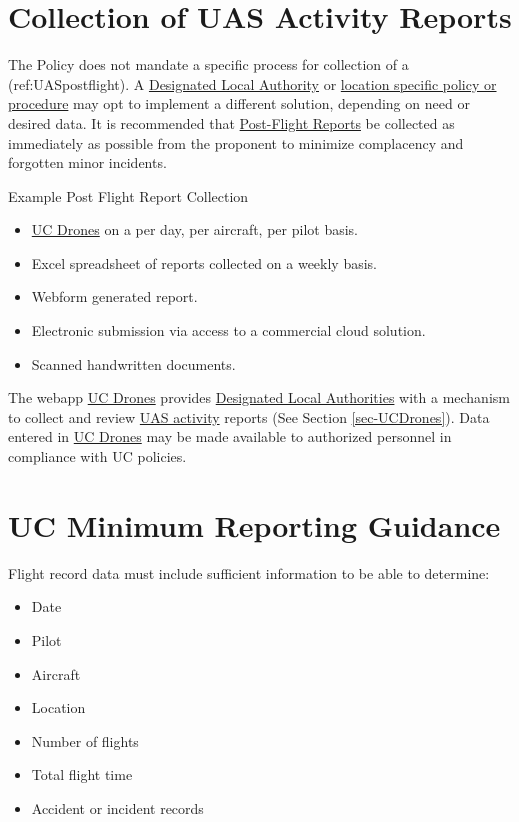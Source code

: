 \documentclass[
]{book}
\providecommand{\tightlist}{%
  \setlength{\itemsep}{0pt}\setlength{\parskip}{0pt}}
\begin{document}
\hypertarget{s-UAS-activity-reports}{%
\section{Collection of UAS Activity Reports}\label{s-UAS-activity-reports}}

The Policy does not mandate a specific process for collection of a (ref:UASpostflight). A \protect\hyperlink{DLA}{Designated Local Authority} or \protect\hyperlink{LSP}{location specific policy or procedure} may opt to implement a different solution, depending on need or desired data. It is recommended that \protect\hyperlink{postflight}{Post-Flight Reports} be collected as immediately as possible from the proponent to minimize complacency and forgotten minor incidents.

Example Post Flight Report Collection

\begin{itemize}
\tightlist
\item
  \protect\hyperlink{UCDrones}{UC Drones} on a per day, per aircraft, per pilot basis.
\item
  Excel spreadsheet of reports collected on a weekly basis.
\item
  Webform generated report.
\item
  Electronic submission via access to a commercial cloud solution.
\item
  Scanned handwritten documents.
\end{itemize}

The webapp \protect\hyperlink{UCDrones}{UC Drones} provides \protect\hyperlink{DLA}{Designated Local Authorities} with a mechanism to collect and review \protect\hyperlink{UASactivity}{UAS activity} reports (See Section \ref{sec-UCDrones}). Data entered in \protect\hyperlink{UCDrones}{UC Drones} may be made available to authorized personnel in compliance with UC policies.

\hypertarget{s-minimum-reporting}{%
\section{UC Minimum Reporting Guidance}\label{s-minimum-reporting}}

Flight record data must include sufficient information to be able to determine:

\begin{itemize}
\tightlist
\item
  Date
\item
  Pilot
\item
  Aircraft
\item
  Location
\item
  Number of flights
\item
  Total flight time
\item
  Accident or incident records
\end{itemize}
\end{document}
